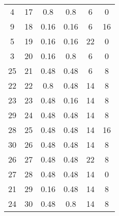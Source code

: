 \begin{longtable}{@{\extracolsep{\fill}}cccccc@{}}
    4   & 17  & 0.8             & 0.8            & 6        & 0        \\
    9   & 18  & 0.16            & 0.16           & 6        & 16       \\
    5   & 19  & 0.16            & 0.16           & 22       & 0        \\
    3   & 20  & 0.16            & 0.8            & 6        & 0        \\
    25  & 21  & 0.48            & 0.48           & 6        & 8        \\
    22  & 22  & 0.8             & 0.48           & 14       & 8        \\
    23  & 23  & 0.48            & 0.16           & 14       & 8        \\
    29  & 24  & 0.48            & 0.48           & 14       & 8        \\
    28  & 25  & 0.48            & 0.48           & 14       & 16       \\
    30  & 26  & 0.48            & 0.48           & 14       & 8        \\
    26  & 27  & 0.48            & 0.48           & 22       & 8        \\
    27  & 28  & 0.48            & 0.48           & 14       & 0        \\
    21  & 29  & 0.16            & 0.48           & 14       & 8        \\
    24  & 30  & 0.48            & 0.8            & 14       & 8        \\ \bottomrule
\end{longtable}
